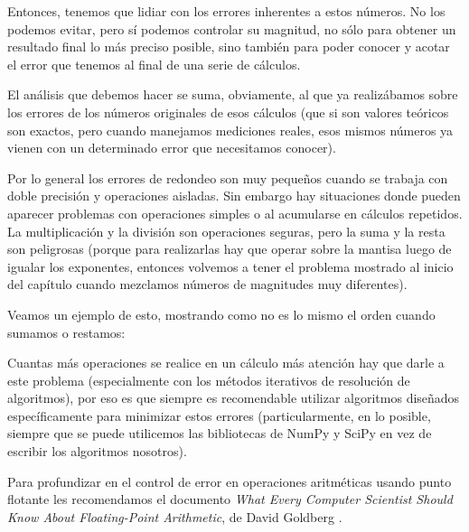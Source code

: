 Entonces, tenemos que lidiar con los errores inherentes a estos números. No los podemos evitar, pero sí podemos controlar su magnitud, no sólo para obtener un resultado final lo más preciso posible, sino también para poder conocer y acotar el error que tenemos al final de una serie de cálculos.

El análisis que debemos hacer se suma, obviamente, al que ya realizábamos sobre los errores de los números originales de esos cálculos (que si son valores teóricos son exactos, pero cuando manejamos mediciones reales, esos mismos números ya vienen con un determinado error que necesitamos conocer).

Por lo general los errores de redondeo son muy pequeños cuando se trabaja con doble precisión y operaciones aisladas. Sin embargo hay situaciones donde pueden aparecer problemas con operaciones simples o al acumularse en cálculos repetidos. La multiplicación y la división son operaciones seguras, pero la suma y la resta son peligrosas (porque para realizarlas hay que operar sobre la mantisa luego de igualar los exponentes, entonces volvemos a tener el problema mostrado al inicio del capítulo cuando mezclamos números de magnitudes muy diferentes).

Veamos un ejemplo de esto, mostrando como no es lo mismo el orden cuando sumamos o restamos:


Cuantas más operaciones se realice en un cálculo más atención hay que darle a este problema (especialmente con los métodos iterativos de resolución de algoritmos), por eso es que siempre es recomendable utilizar algoritmos diseñados específicamente para minimizar estos errores (particularmente, en lo posible, siempre que se puede utilicemos las bibliotecas de NumPy y SciPy en vez de escribir los algoritmos nosotros).

Para profundizar en el control de error en operaciones aritméticas usando punto flotante les recomendamos el documento \textit{What Every Computer Scientist Should Know About Floating-Point Arithmetic}, de David Goldberg \cite{compscientist-floatingpoint}.
